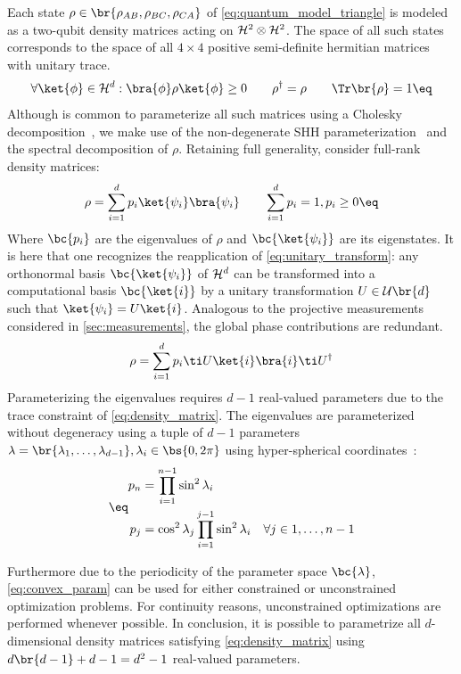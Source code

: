 \documentclass[aps, 10pt, english, twoside, pra, nofootinbib, tightenlines, longbibliography, superscriptaddress]{revtex4-1}
\begin{document}
    Each state $\rho \in \br{\rho_{AB}, \rho_{BC}, \rho_{CA}}$ of \cref{eq:quantum_model_triangle} is modeled as a two-qubit density matrices acting on $\mathcal{H}^2 \otimes \mathcal{H}^2$. The space of all such states corresponds to the space of all $4\times 4$ positive semi-definite hermitian matrices with unitary trace.
    \[ \forall \ket{\phi} \in \Hilb^d: \bra{\phi} \rho \ket{\phi} \geq 0 \qquad \rho^{\dagger} = \rho \qquad \Tr\br{\rho} = 1 \eq \label{eq:density_matrix}\]
    Although is common to parameterize all such matrices using a Cholesky decomposition~\cite{Grasmair_2014}, we make use of the non-degenerate SHH parameterization~\cite{Spengler_2010_Unitary} and the spectral decomposition of $\rho$. Retaining full generality, consider full-rank density matrices:
    \[ \rho = \sum_{i=1}^{d} p_i \ket{\psi_i}\bra{\psi_i} \qquad \sum_{i=1}^{d} p_i = 1, p_i \geq 0 \eq \label{eq:param_density} \]
    Where $\bc{p_i}$ are the eigenvalues of $\rho$ and $\bc{\ket{\psi_i}}$ are its eigenstates. It is here that one recognizes the reapplication of \cref{eq:unitary_transform}: any orthonormal basis $\bc{\ket{\psi_i}}$ of $\mathcal{H}^d$ can be transformed into a computational basis $\bc{\ket{i}}$ by a unitary transformation $U \in \mathcal{U}\br{d}$ such that $\ket{\psi_i} = U\ket{i}$. Analogous to the projective measurements considered in \cref{sec:measurements}, the global phase contributions are redundant.
    \[ \rho = \sum_{i=1}^{d} p_i \ti U\ket{i}\bra{i} \ti U^{\dagger} \]
    Parameterizing the eigenvalues requires $d - 1$ real-valued parameters due to the trace constraint of \cref{eq:density_matrix}. The eigenvalues are parameterized without degeneracy using a tuple of $d-1$ parameters $\lambda = \br{\lambda_1, \ldots, \lambda_{d-1}}, \lambda_i \in \bs{0, 2 \pi}$ using hyper-spherical coordinates~\cite{Hedemann_2013, Spengler_2010_Unitary}:
    \begin{align*}
    \eq \label{eq:convex_param}
    \begin{split}
        p_n &= \prod_{i=1}^{n-1} \sin^2 \lambda_i \\
        p_j &= \cos^2 \lambda_j \prod_{i=1}^{j-1} \sin^2 \lambda_i \quad \forall j \in 1, \ldots, n - 1
    \end{split}
    \end{align*}

    Furthermore due to the periodicity of the parameter space $\bc{\lambda}$, \cref{eq:convex_param} can be used for either constrained or unconstrained optimization problems. For continuity reasons, unconstrained optimizations are performed whenever possible. In conclusion, it is possible to parametrize all $d$-dimensional density matrices satisfying \cref{eq:density_matrix} using $d\br{d - 1} + d - 1 = d^2 -1$ real-valued parameters.
\end{document}
